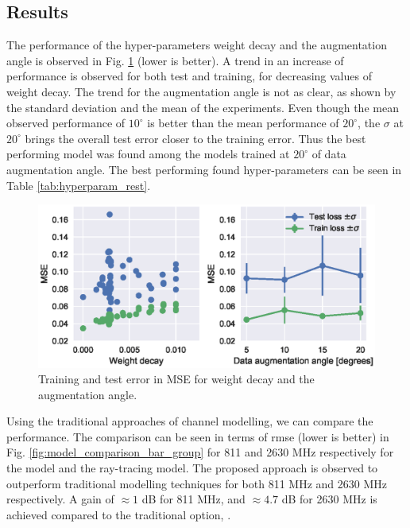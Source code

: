\subsection{Results}

The performance of the hyper-parameters weight decay and the augmentation angle is observed in Fig. \ref{fig:hyperparameters_weight_decay} (lower is better). A trend in an increase of performance is observed for both test and training, for decreasing values of weight decay. The trend for the augmentation angle is not as clear, as shown by the standard deviation and the mean of the experiments. Even though the mean observed performance of $10^{\circ}$ is better than the mean performance of $20^{\circ}$, the $\sigma$ at $20^{\circ}$ brings the overall test error closer to the training error. Thus the best performing model was found among the models trained at $20^{\circ}$ of data augmentation angle. The best performing found hyper-parameters can be seen in Table \ref{tab:hyperparam_rest}.

\begin{figure}
    \centering
    \includegraphics{chapters/part_pathloss/model_aided_paper/hyperparameters_grayscale.eps}
    \caption{Training and test error in MSE for weight decay and the augmentation angle.}
    \label{fig:hyperparameters_weight_decay}
\end{figure}


Using the traditional approaches of channel modelling, we can compare the performance. The comparison can be seen in terms of \gls{rmse} (lower is better) in Fig. \ref{fig:model_comparison_bar_group} for 811 and 2630 MHz respectively for the  model and the ray-tracing model. The proposed approach is observed to outperform traditional modelling techniques for both 811 MHz and 2630 MHz respectively. A gain of $\approx 1$ dB for 811 MHz, and $\approx 4.7$ dB for 2630 MHz is achieved compared to the traditional option, . 


